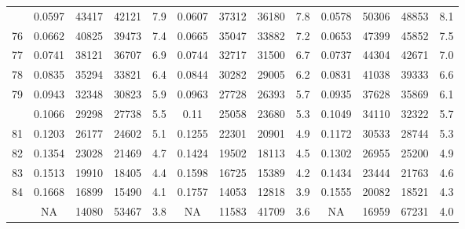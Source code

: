 \documentclass[
  14pt,
]{article}
\begin{document}
\begin{longtable}[t]{lcccccccccccc}
\addlinespace
75 & 0.0597 & 43417 & 42121 & 7.9 & 0.0607 & 37312 & 36180 & 7.8 & 0.0578 & 50306 & 48853 & 8.1\\
76 & 0.0662 & 40825 & 39473 & 7.4 & 0.0665 & 35047 & 33882 & 7.2 & 0.0653 & 47399 & 45852 & 7.5\\
77 & 0.0741 & 38121 & 36707 & 6.9 & 0.0744 & 32717 & 31500 & 6.7 & 0.0737 & 44304 & 42671 & 7.0\\
78 & 0.0835 & 35294 & 33821 & 6.4 & 0.0844 & 30282 & 29005 & 6.2 & 0.0831 & 41038 & 39333 & 6.6\\
79 & 0.0943 & 32348 & 30823 & 5.9 & 0.0963 & 27728 & 26393 & 5.7 & 0.0935 & 37628 & 35869 & 6.1\\
\addlinespace
80 & 0.1066 & 29298 & 27738 & 5.5 & 0.11 & 25058 & 23680 & 5.3 & 0.1049 & 34110 & 32322 & 5.7\\
81 & 0.1203 & 26177 & 24602 & 5.1 & 0.1255 & 22301 & 20901 & 4.9 & 0.1172 & 30533 & 28744 & 5.3\\
82 & 0.1354 & 23028 & 21469 & 4.7 & 0.1424 & 19502 & 18113 & 4.5 & 0.1302 & 26955 & 25200 & 4.9\\
83 & 0.1513 & 19910 & 18405 & 4.4 & 0.1598 & 16725 & 15389 & 4.2 & 0.1434 & 23444 & 21763 & 4.6\\
84 & 0.1668 & 16899 & 15490 & 4.1 & 0.1757 & 14053 & 12818 & 3.9 & 0.1555 & 20082 & 18521 & 4.3\\
\addlinespace
85 & NA & 14080 & 53467 & 3.8 & NA & 11583 & 41709 & 3.6 & NA & 16959 & 67231 & 4.0\\*
\end{longtable}
\end{document}
